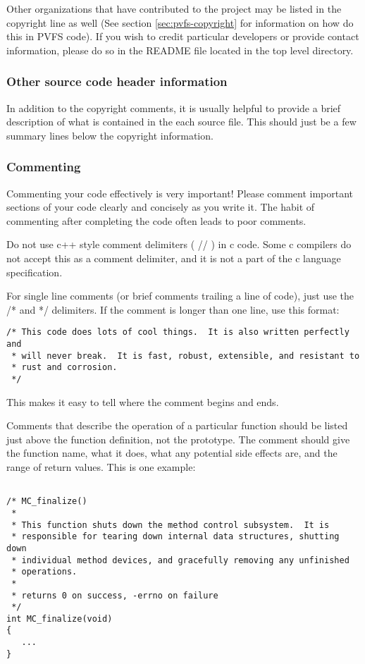 \documentclass[11pt, letterpaper]{article}
\begin{document}
Other organizations that have contributed to the project may be listed
in the copyright line as well (See section \ref{sec:pvfs-copyright} for information on how do this in PVFS code).  If you wish to credit particular developers or
provide contact information, please do so in the README file located in
the top level directory.

\subsubsection{Other source code header information}

In addition to the copyright comments, it is usually
helpful to provide a brief description of what is contained in the
each source file.  This should just be a few summary lines below the
copyright information.

\subsubsection{Commenting}
\label{sec:comments}

Commenting your code effectively is very important!  Please comment
important sections of your code clearly and concisely as you write it.
The habit of commenting after completing the code often leads to poor
comments.  

Do not use c++ style comment delimiters ( // ) in c code.  Some c
compilers do not accept this as a comment delimiter, and it is not a
part of the c language specification. 

For single line comments (or brief comments trailing a line of code),
just use the /* and */ delimiters.  If the comment is longer than one
line, use this format:

\begin{verbatim}
/* This code does lots of cool things.  It is also written perfectly and
 * will never break.  It is fast, robust, extensible, and resistant to
 * rust and corrosion.
 */
\end{verbatim}

This makes it easy to tell where the comment begins and ends.

Comments that describe the operation of a particular function should be
listed just above the function definition, not the prototype.  The
comment should give the function name, what it does, what any potential
side effects are, and the range of return values.  This is one example:

\begin{verbatim}

/* MC_finalize()
 *
 * This function shuts down the method control subsystem.  It is
 * responsible for tearing down internal data structures, shutting down
 * individual method devices, and gracefully removing any unfinished
 * operations.
 *
 * returns 0 on success, -errno on failure
 */
int MC_finalize(void)
{
   ...
}
\end{verbatim}
\end{document}
